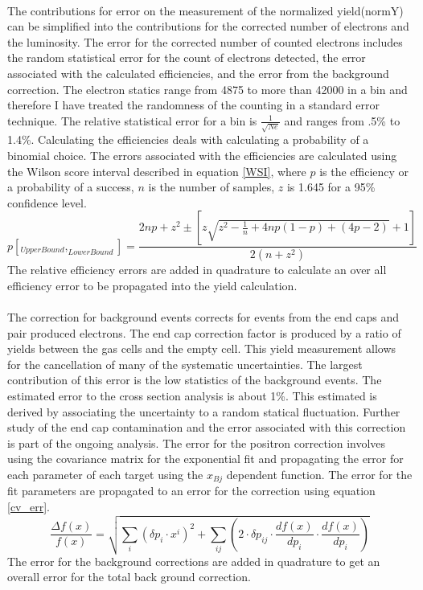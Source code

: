 \paragraph{}
The contributions for error on the measurement of the normalized yield(normY) can be simplified into the contributions for the corrected number of electrons and the luminosity. The error for the corrected number of counted electrons includes the random statistical error for the count of electrons detected, the error associated with the calculated efficiencies, and the error from the background correction. The electron statics range from 4875 to more than 42000 in a bin and therefore I have treated the randomness of the counting in a standard error technique. The relative statistical error for a bin is $\frac{1}{\sqrt{Ne}}$ and ranges from .5\% to 1.4\%. Calculating the efficiencies deals with calculating a probability of a binomial choice. The errors associated with the efficiencies are calculated using the Wilson score interval described in equation \ref{WSI}, where $p$ is the efficiency or a probability of a success, $n$ is the number of samples, $z$ is 1.645 for a 95\% confidence level. 
\begin{equation}
p[_{UpperBound},_{LowerBound}] = \frac{ 2np +z^2 \pm \left[z\sqrt{z^2 - \frac{1}{n} + 4np(1-p) +(4p-2)} + 1 \right]}{2(n+z^2)} \label{WSI}
\end{equation}
The relative efficiency errors are added in quadrature to calculate an over all efficiency error to be propagated into the yield calculation.
\paragraph{}The correction for background events corrects for events from the end caps and pair produced electrons. The end cap correction factor is produced by a ratio of yields between the gas cells and the empty cell. This yield measurement allows for the cancellation of many of the systematic uncertainties. The largest contribution of this error is the low statistics of the background events. The estimated error to the cross section analysis is about 1\%. This estimated is derived by associating the uncertainty to a random statical fluctuation. Further study of the end cap contamination and the error associated with this correction is part of the ongoing analysis. The error for the positron correction involves using the covariance matrix for the exponential fit and propagating the error for each parameter of each target using the $x_{Bj}$ dependent function. The error for the fit parameters are propagated to an error for the correction using equation \ref{cv_err}.
\begin{equation}
\frac{\Delta f(x)}{f(x)} =  \sqrt{ \sum_{i}^{} \left(\delta p_i\cdot x^i\right)^2 + \sum_{ij}^{}\left( 2\cdot \delta p_{ij}\cdot \dfrac{df(x)}{dp_i}\cdot \dfrac{df(x)}{dp_i}\right) } \label{cv_err}
\end{equation}
The error for the background corrections are added in quadrature to get an overall error for the total back ground correction.  
